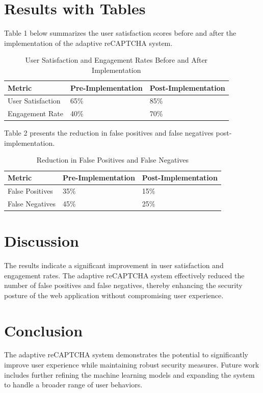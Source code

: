 \documentclass{article}
\begin{document}
\section{Results with Tables}
Table 1 below summarizes the user satisfaction scores before and after the implementation of the adaptive reCAPTCHA system.

\begin{table}[h]
\centering
\begin{tabular}{@{}ll@{}}
\toprule
Metric & Pre-Implementation & Post-Implementation \\ \midrule
User Satisfaction & 65\% & 85\% \\
Engagement Rate & 40\% & 70\% \\ \bottomrule
\end{tabular}
\caption{User Satisfaction and Engagement Rates Before and After Implementation}
\label{tab:user_satisfaction}
\end{table}

Table 2 presents the reduction in false positives and false negatives post-implementation.

\begin{table}[h]
\centering
\begin{tabular}{@{}ll@{}}
\toprule
Metric & Pre-Implementation & Post-Implementation \\ \midrule
False Positives & 35\% & 15\% \\
False Negatives & 45\% & 25\% \\ \bottomrule
\end{tabular}
\caption{Reduction in False Positives and False Negatives}
\label{tab:false_pos_neg}
\end{table}

\section{Discussion}
The results indicate a significant improvement in user satisfaction and engagement rates. The adaptive reCAPTCHA system effectively reduced the number of false positives and false negatives, thereby enhancing the security posture of the web application without compromising user experience.

\section{Conclusion}
The adaptive reCAPTCHA system demonstrates the potential to significantly improve user experience while maintaining robust security measures. Future work includes further refining the machine learning models and expanding the system to handle a broader range of user behaviors.
\end{document}

